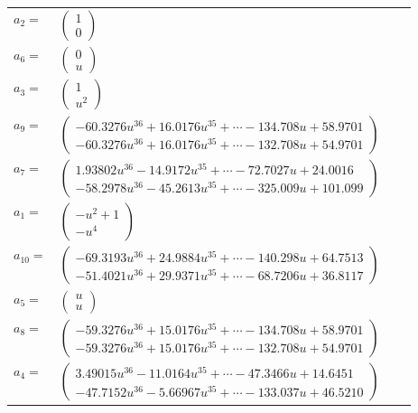 \documentclass[1p]{elsarticle_modified}
\theoremstyle{definition}
\begin{document}
\begin{tabular}{m{7pt} m{180pt} m{7pt} m{180pt} }
\flushright $a_{2}=$&$\begin{pmatrix}1\\0\end{pmatrix}$ \\
\flushright $a_{6}=$&$\begin{pmatrix}0\\u\end{pmatrix}$ \\
\flushright $a_{3}=$&$\begin{pmatrix}1\\u^2\end{pmatrix}$ \\
\flushright $a_{9}=$&$\begin{pmatrix}-60.3276 u^{36}+16.0176 u^{35}+\cdots-134.708 u+58.9701\\-60.3276 u^{36}+16.0176 u^{35}+\cdots-132.708 u+54.9701\end{pmatrix}$ \\
\flushright $a_{7}=$&$\begin{pmatrix}1.93802 u^{36}-14.9172 u^{35}+\cdots-72.7027 u+24.0016\\-58.2978 u^{36}-45.2613 u^{35}+\cdots-325.009 u+101.099\end{pmatrix}$ \\
\flushright $a_{1}=$&$\begin{pmatrix}- u^2+1\\- u^4\end{pmatrix}$ \\
\flushright $a_{10}=$&$\begin{pmatrix}-69.3193 u^{36}+24.9884 u^{35}+\cdots-140.298 u+64.7513\\-51.4021 u^{36}+29.9371 u^{35}+\cdots-68.7206 u+36.8117\end{pmatrix}$ \\
\flushright $a_{5}=$&$\begin{pmatrix}u\\u\end{pmatrix}$ \\
\flushright $a_{8}=$&$\begin{pmatrix}-59.3276 u^{36}+15.0176 u^{35}+\cdots-134.708 u+58.9701\\-59.3276 u^{36}+15.0176 u^{35}+\cdots-132.708 u+54.9701\end{pmatrix}$ \\
\flushright $a_{4}=$&$\begin{pmatrix}3.49015 u^{36}-11.0164 u^{35}+\cdots-47.3466 u+14.6451\\-47.7152 u^{36}-5.66967 u^{35}+\cdots-133.037 u+46.5210\end{pmatrix}$ \\

\end{tabular}
\end{document}

